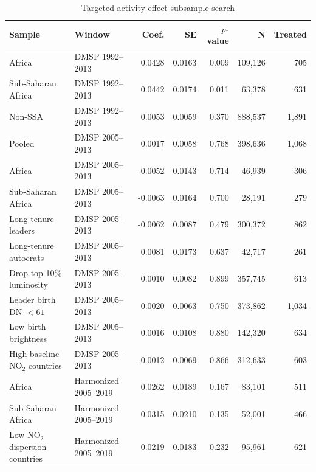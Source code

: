 \documentclass[9pt,twocolumn,twoside]{pnas-new}
\begin{document}
\begin{table}[t]
\centering
\caption{Targeted activity-effect subsample search}
\begin{tabular*}{\textwidth}{l @{\extracolsep{\fill}} l r r r r r}
Sample & Window & Coef. & SE & $p$-value & N & Treated \\
\midrule
Africa & DMSP 1992--2013 & 0.0428 & 0.0163 & 0.009 & 109{,}126 & 705 \\
Sub-Saharan Africa & DMSP 1992--2013 & 0.0442 & 0.0174 & 0.011 & 63{,}378 & 631 \\
Non-SSA & DMSP 1992--2013 & 0.0053 & 0.0059 & 0.370 & 888{,}537 & 1{,}891 \\
\midrule
Pooled & DMSP 2005--2013 & 0.0017 & 0.0058 & 0.768 & 398{,}636 & 1{,}068 \\
Africa & DMSP 2005--2013 & -0.0052 & 0.0143 & 0.714 & 46{,}939 & 306 \\
Sub-Saharan Africa & DMSP 2005--2013 & -0.0063 & 0.0164 & 0.700 & 28{,}191 & 279 \\
Long-tenure leaders & DMSP 2005--2013 & -0.0062 & 0.0087 & 0.479 & 300{,}372 & 862 \\
Long-tenure autocrats & DMSP 2005--2013 & 0.0081 & 0.0173 & 0.637 & 42{,}717 & 261 \\
Drop top 10\% luminosity & DMSP 2005--2013 & 0.0010 & 0.0082 & 0.899 & 357{,}745 & 613 \\
Leader birth DN $< 61$ & DMSP 2005--2013 & 0.0020 & 0.0063 & 0.750 & 373{,}862 & 1{,}034 \\
Low birth brightness & DMSP 2005--2013 & 0.0016 & 0.0108 & 0.880 & 142{,}320 & 634 \\
High baseline NO$_2$ countries & DMSP 2005--2013 & -0.0012 & 0.0069 & 0.866 & 312{,}633 & 603 \\
\midrule
Africa & Harmonized 2005--2019 & 0.0262 & 0.0189 & 0.167 & 83{,}101 & 511 \\
Sub-Saharan Africa & Harmonized 2005--2019 & 0.0315 & 0.0210 & 0.135 & 52{,}001 & 466 \\
Low NO$_2$ dispersion countries & Harmonized 2005--2019 & 0.0219 & 0.0183 & 0.232 & 95{,}961 & 621 \\
\bottomrule
\end{tabular*}
\label{tab:subsample-firststage}
\end{table}
\end{document}
